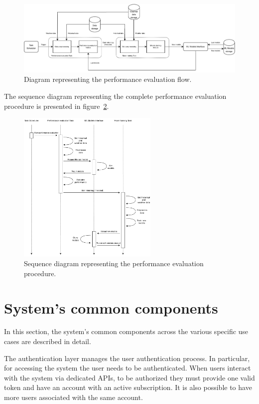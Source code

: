 \begin{figure}[H]
\centering
\includegraphics[width=1\textwidth]{images/architecture_scheduler_flow}
\caption{Diagram representing the performance evaluation flow.}
\label{fig:schedulerflow}
\end{figure}

The sequence diagram representing the complete performance evaluation procedure is presented in figure~\ref{fig:schedulersequence}.

\begin{figure}[H]
\centering
\includegraphics[width=0.6\textwidth]{images/architecture_scheduler_sequence}
\caption{Sequence diagram representing the performance evaluation procedure.}
\label{fig:schedulersequence}
\end{figure}


\section{System's common components}
\label{sec:components}
\vspace{0.2 cm}

In this section, the system's common components across the various specific use cases are described in detail.

The authentication layer manages the user authentication process.
In particular, for accessing the system the user needs to be authenticated.
When users interact with the system via dedicated APIs, to be authorized they must provide one valid token and have an account with an active subscription.
It is also possible to have more users associated with the same account.

